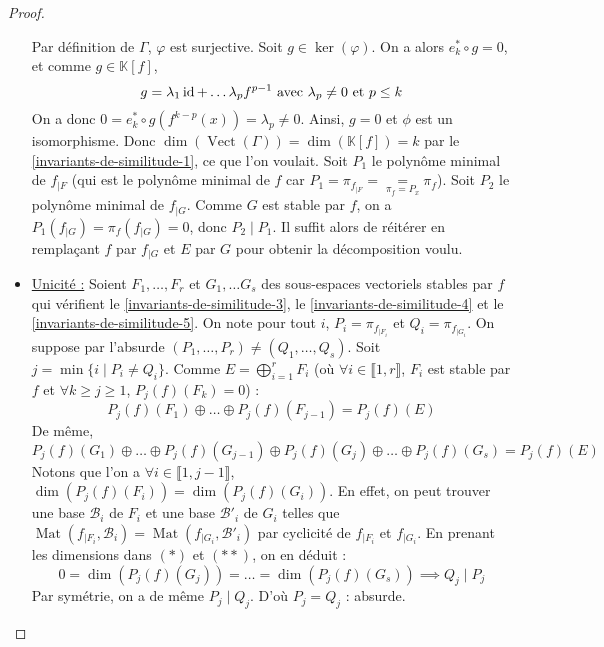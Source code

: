 \begin{proof}
\begin{itemize}
\[      \]
      Par définition de $\Gamma$, $\varphi$ est surjective. Soit $g \in \ker(\varphi)$. On a alors $e_k^* \circ g = 0$, et comme $g \in \mathbb{K}[f]$,
      \[ g = \lambda_1 \operatorname{id} + \dots \lambda_p f^{p-1} \text{ avec } \lambda_p \neq 0 \text{ et } p \leq k \]
      On a donc $0 = e_k^* \circ g(f^{k-p} (x)) = \lambda_p \neq 0$. Ainsi, $g = 0$ et $\phi$ est un isomorphisme. Donc $\dim(\operatorname{Vect}(\Gamma)) = \dim(\mathbb{K}[f]) = k$ par le \cref{invariants-de-similitude-1}, ce que l'on voulait.
      \newpar
      Soit $P_1$ le polynôme minimal de $f_{|F}$ (qui est le polynôme minimal de $f$ car $P_1 = \pi_{f_{|F}} = \underset{\pi_f = P_x}{=} \pi_f$). Soit $P_2$ le polynôme minimal de $f_{|G}$. Comme $G$ est stable par $f$, on a $P_1(f_{|G}) = \pi_f(f_{|G}) = 0$, donc $P_2 \mid P_1$. Il suffit alors de réitérer en remplaçant $f$ par $f_{|G}$ et $E$ par $G$ pour obtenir la décomposition voulu.
      \item \uline{Unicité :} Soient $F_1, \dots, F_r$ et $G_1, \dots G_s$ des sous-espaces vectoriels stables par $f$ qui vérifient le \cref{invariants-de-similitude-3}, le \cref{invariants-de-similitude-4} et le \cref{invariants-de-similitude-5}. On note pour tout $i$, $P_i = \pi_{f_{|F_i}}$ et $Q_i = \pi_{f_{|G_i}}$. On suppose par l'absurde $(P_1, \dots, P_r) \neq (Q_1, \dots, Q_s)$. Soit $j = \min\{ i \mid P_i \neq Q_i \}$.
      Comme $E = \bigoplus_{i = 1}^r F_i$ (où $\forall i \in \llbracket 1, r \rrbracket$, $F_i$ est stable par $f$ et $\forall k \geq j \geq 1$, $P_j(f)(F_k) = 0$) :
      \[ P_j(f)(F_1) \oplus \dots \oplus P_j(f)(F_{j-1}) = P_j(f)(E) \tag{$*$} \]
      De même,
      \[ P_j(f)(G_1) \oplus \dots \oplus P_j(f)(G_{j-1}) \oplus P_j(f)(G_j) \oplus \dots \oplus P_j(f)(G_s) = P_j(f)(E) \tag{$**$} \]
      Notons que l'on a $\forall i \in \llbracket 1, j-1 \rrbracket$, $\dim(P_j(f)(F_i)) = \dim(P_j(f)(G_i))$. En effet, on peut trouver une base $\mathcal{B}_i$ de $F_i$ et une base $\mathcal{B}'_i$ de $G_i$ telles que $\operatorname{Mat}(f_{|F_i}, \mathcal{B}_i) = \operatorname{Mat}(f_{|G_i}, \mathcal{B}'_i)$ par cyclicité de $f_{|F_i}$ et $f_{|G_i}$. En prenant les dimensions dans $(*)$ et $(**)$, on en déduit :
      \[ 0 = \dim(P_j(f)(G_j)) = \dots = \dim(P_j(f)(G_s)) \implies Q_j \mid P_j \]
      Par symétrie, on a de même $P_j \mid Q_j$. D'où $P_j = Q_j$ : absurde.
    \end{itemize}
  \end{proof}

